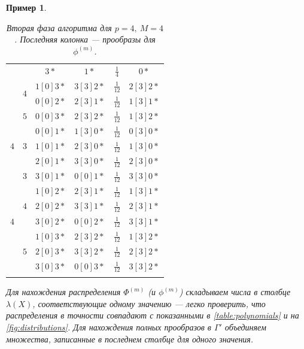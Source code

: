 \documentclass[14pt, a4paper, russian]{report}
\newtheorem{example}{\indent Пример}
\begin{document}
\begin{example}
\begin{longtable}{|c|c|c|c|c|c|}
                    &     &  $3*$     & $1*$     & $\frac{1}{4} $ & $0*$     \\ \cline{2-6}
                    & \multirow{2}{*}{$4$}
                          &  $1[0]3*$ & $3[3]2*$ & $\frac{1}{12}$ & $2[3]2*$ \\
                    &     &  $0[0]2*$ & $2[3]1*$ & $\frac{1}{12}$ & $1[3]1*$ \\ \cline{2-6}
                    & $5$ &  $0[0]3*$ & $2[3]2*$ & $\frac{1}{12}$ & $1[3]2*$ \\ \hline
\multirow{3}{*}{$4$}& \multirow{3}{*}{$3$}
                          & $0[0]1*$ & $1[3]0*$ & $\frac{1}{12}$ & $0[3]0*$ \\ 
                    &     & $1[0]1*$ & $2[3]0*$ & $\frac{1}{12}$ & $1[3]0*$ \\
                    &     & $2[0]1*$ & $3[3]0*$ & $\frac{1}{12}$ & $2[3]0*$ \\ \hline
\multirow{7}{*}{$4$}& $3$ & $3[0]1*$ & $0[0]1*$ & $\frac{1}{12}$ & $3[3]0*$ \\ \cline{2-6}
     &\multirow{3}{*}{$4$} & $1[0]2*$ & $2[3]1*$ & $\frac{1}{12}$ & $1[3]1*$ \\
     &                     & $2[0]2*$ & $3[3]1*$ & $\frac{1}{12}$ & $2[3]1*$ \\
     &                     & $3[0]2*$ & $0[0]2*$ & $\frac{1}{12}$ & $3[3]1*$ \\ \cline{2-6}
    &\multirow{3}{*}{$5$} & $1[0]3*$ & $2[3]2*$ & $\frac{1}{12}$ & $1[3]2*$ \\
    &                     & $2[0]3*$ & $3[3]2*$ & $\frac{1}{12}$ & $2[3]2*$ \\
    &                     & $3[0]3*$ & $0[0]3*$ & $\frac{1}{12}$ & $3[3]2*$ \\ \hline               
                   
\caption{\label{table:algorithm_second_phase} Вторая фаза алгоритма для $p=4,\ M=4$. Последняя колонка --- прообразы для $\phi^{(m)}$.}                   
\end{longtable}
Для нахождения распределения $\Phi^{(m)}$ (и $\phi^{(m)}$) складываем числа в столбце $\lambda(X)$, соответствующие одному значению --- легко проверить, что распределения в точности совпадают с показанными в \cref{table:polynomials} и на \cref{fig:distributions}. Для нахождения полных прообразов в $\Gamma'$ объединяем множества, записанные в последнем столбце для одного значения.
\end{example}
\end{document}
